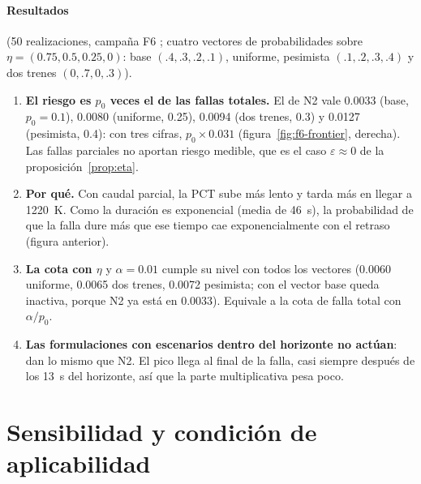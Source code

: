 \paragraph{Resultados} (50 realizaciones, campaña F6 ; cuatro vectores de
probabilidades sobre $\eta=(0.75,0.5,0.25,0)$: base $(.4,.3,.2,.1)$, uniforme, pesimista
$(.1,.2,.3,.4)$ y dos trenes $(0,.7,0,.3)$).
\begin{enumerate}
  \item \textbf{El riesgo es $p_0$ veces el de las fallas totales.} El de N2 vale 0.0033
        (base, $p_0=0.1$), 0.0080 (uniforme, 0.25), 0.0094 (dos trenes, 0.3) y 0.0127
        (pesimista, 0.4): con tres cifras, $p_0\times0.031$ (figura~\ref{fig:f6-frontier},
        derecha). Las fallas parciales no aportan riesgo medible, que es el caso
        $\varepsilon\approx0$ de la proposición~\ref{prop:eta}.
  \item \textbf{Por qué.} Con caudal parcial, la PCT sube más lento y tarda más en llegar a
        1220~K. Como la duración es exponencial (media de 46~s), la probabilidad de que la falla
        dure más que ese tiempo cae exponencialmente con el retraso (figura anterior).
  \item \textbf{La cota con $\eta$} y $\alpha=0.01$ cumple su nivel con todos los vectores
        (0.0060 uniforme, 0.0065 dos trenes, 0.0072 pesimista; con el vector base queda
        inactiva, porque N2 ya está en 0.0033). Equivale a la cota de falla total con
        $\alpha/p_0$.
  \item \textbf{Las formulaciones con escenarios dentro del horizonte no actúan}: dan lo mismo
        que N2. El pico llega al final de la falla, casi siempre después de los 13~s del
        horizonte, así que la parte multiplicativa pesa poco.
\end{enumerate}


\section{Sensibilidad y condición de aplicabilidad}\label{sec:riesgo-aplicabilidad}
